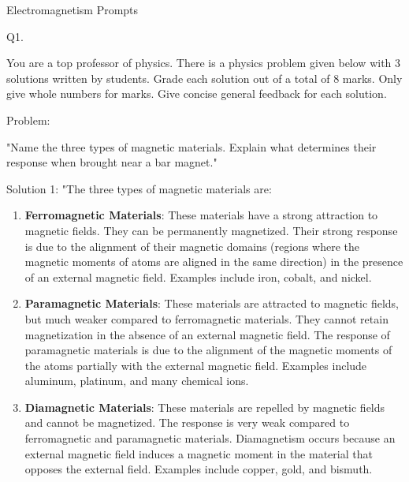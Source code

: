 



Electromagnetism Prompts

                           Q1. 

You are a top professor of physics. There is a physics problem given below with 3 solutions written by students. Grade each solution out of a total of 8 marks. Only give whole numbers for marks. Give concise general feedback for each solution. 

Problem: 

"Name the three types of magnetic materials. Explain what determines their response when brought near a bar magnet."

Solution 1: 
"The three types of magnetic materials are:

\begin{enumerate}
    \item \textbf{Ferromagnetic Materials}: These materials have a strong attraction to magnetic fields. They can be permanently magnetized. Their strong response is due to the alignment of their magnetic domains (regions where the magnetic moments of atoms are aligned in the same direction) in the presence of an external magnetic field. Examples include iron, cobalt, and nickel.
    \item \textbf{Paramagnetic Materials}: These materials are attracted to magnetic fields, but much weaker compared to ferromagnetic materials. They cannot retain magnetization in the absence of an external magnetic field. The response of paramagnetic materials is due to the alignment of the magnetic moments of the atoms partially with the external magnetic field. Examples include aluminum, platinum, and many chemical ions.
    \item \textbf{Diamagnetic Materials}: These materials are repelled by magnetic fields and cannot be magnetized. The response is very weak compared to ferromagnetic and paramagnetic materials. Diamagnetism occurs because an external magnetic field induces a magnetic moment in the material that opposes the external field. Examples include copper, gold, and bismuth.
\end{enumerate}

